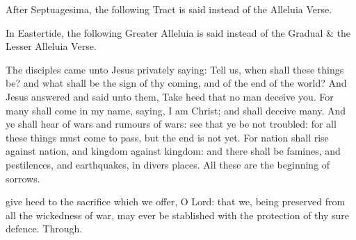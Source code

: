 
\begin{rubric}
    After Septuagesima, the following Tract is said instead of the Alleluia Verse.
\end{rubric}


\begin{rubric}
    In Eastertide, the following Greater Alleluia is said instead of the Gradual \& the Lesser Alleluia Verse.
\end{rubric}


 The disciples came unto Jesus privately saying: Tell us, when shall these things be? and what shall be the sign of thy coming, and of the end of the world? And Jesus answered and said unto them, Take heed that no man deceive you. For many shall come in my name, saying, I am Christ; and shall deceive many. And ye shall hear of wars and rumours of wars: see that ye be not troubled: for all these things must come to pass, but the end is not yet. For nation shall rise against nation, and kingdom against kingdom: and there shall be famines, and pestilences, and earthquakes, in divers places. All these are the beginning of sorrows.


\secret
{} give heed to the sacrifice which we offer, O Lord: that we, being preserved from all the wickedness of war, may ever be stablished with the protection of thy sure defence. Through.

